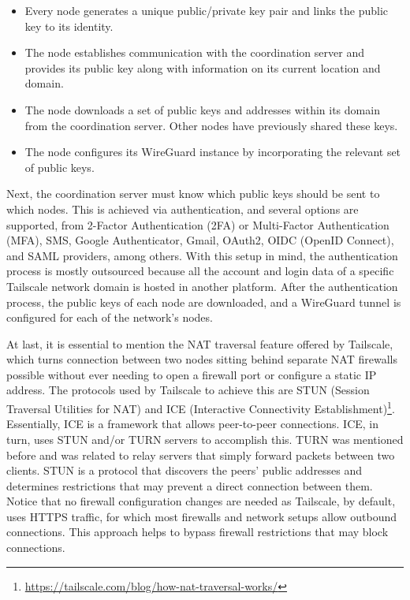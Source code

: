 \begin{itemize}
    \item Every node generates a unique public/private key pair and links the public key to its identity.
    \item The node establishes communication with the coordination server and provides its public key along with information on its current location and domain.
    \item The node downloads a set of public keys and addresses within its domain from the coordination server. Other nodes have previously shared these keys.
    \item The node configures its WireGuard instance by incorporating the relevant set of public keys.
\end{itemize}

Next, the coordination server must know which public keys should be sent to which nodes. This is achieved via authentication, and several options are supported, from 2-Factor Authentication (2FA) or Multi-Factor Authentication (MFA), SMS, Google Authenticator, Gmail, OAuth2, OIDC (OpenID Connect), and SAML providers, among others. With this setup in mind, the authentication process is mostly outsourced because all the account and login data of a specific Tailscale network domain is hosted in another platform. After the authentication process, the public keys of each node are downloaded, and a WireGuard tunnel is configured for each of the network's nodes.

At last, it is essential to mention the NAT traversal feature offered by Tailscale, which turns connection between two nodes sitting behind separate NAT firewalls possible without ever needing to open a firewall port or configure a static IP address. The protocols used by Tailscale to achieve this are STUN (Session Traversal Utilities for NAT) and ICE (Interactive Connectivity Establishment)\footnote{\url{https://tailscale.com/blog/how-nat-traversal-works/}}. Essentially, ICE is a framework that allows peer-to-peer connections. ICE, in turn, uses STUN and/or TURN servers to accomplish this. TURN was mentioned before and was related to relay servers that simply forward packets between two clients. STUN is a protocol that discovers the peers' public addresses and determines restrictions that may prevent a direct connection between them. Notice that no firewall configuration changes are needed as Tailscale, by default, uses HTTPS traffic, for which most firewalls and network setups allow outbound connections. This approach helps to bypass firewall restrictions that may block connections.

